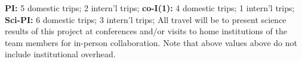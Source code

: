 \documentclass[usenames,dvipsnames,modern]{CLASS_FILES/aastex631}
\begin{document}
\begin{table}[h!]
{      \smallIndent \textbf{PI:} 5 domestic trips; 2 intern'l trips;\newline
      \smallIndent \textbf{co-I(1):} 4 domestic trips; 1 intern'l trips;\newline
      \smallIndent \textbf{Sci-PI:} 6 domestic trips; 3 intern'l trips;\newline
      \newline
      All travel will be to present science results of this project at conferences and/or visits to home institutions of the team members for in-person collaboration. Note that above values above do not include institutional overhead.}
   \label{tab:isANONtravel}
\end{table}

\newpage
\end{document}
